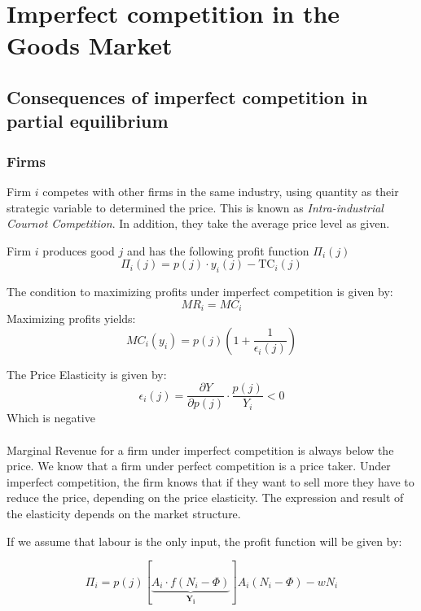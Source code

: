 \section{Imperfect competition in the Goods Market}



\subsection*{Consequences of imperfect competition in partial equilibrium}


\subsubsection{Firms}

Firm $i$ competes with other firms in the same industry, using quantity as their strategic variable to determined the price. This is known as \textit{Intra-industrial Cournot Competition}. In addition, they take the average price level as given. 

Firm $i$ produces good $j$ and has the following profit function $\Pi_i (j)$
\begin{equation*}
    \Pi_i(j) = p ( j ) \cdot  y _ { i }(j) - \text{TC}_i(j)
\end{equation*}

The condition to maximizing profits under imperfect competition is given by:
$$
MR_i = MC_i 
$$
 Maximizing profits yields:
 $$
 MC_i (y_i) = p(j)\left( 1 + \frac{1}{\epsilon_i(j)} \right)
 $$
 
 
 The Price Elasticity is given by:
 $$
 \epsilon_i (j) = \frac{\partial Y}{\partial p(j)} \cdot \frac{p(j)}{Y_i} < 0 
 $$
Which is negative 

\paragraph{}
 Marginal Revenue for a firm under imperfect competition is always below the price. We know that a firm under perfect competition is a price taker. Under imperfect competition, the firm knows that if they want to sell more they have to reduce the price, depending on the price elasticity. The expression and result of the elasticity depends on the market structure. 
 
 If we assume that labour is the only input, the profit function will be given by:

 $$
 \Pi_i = p(j)\left[\underbrace{A_i \cdot f(N_i - \Phi)}_\mathbf{{Y_i}}   \right] A_i (N_i - \Phi) - wN_i
 $$
 

